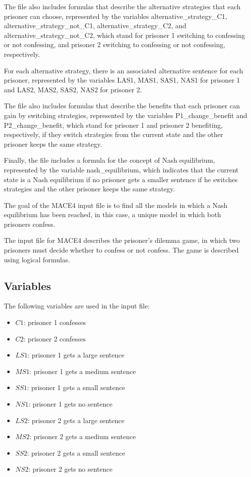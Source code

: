 \documentclass[a4paper,12pt]{report}
\begin{document}
The file also includes formulas that describe the alternative strategies that each prisoner can choose, represented by the variables alternative\_strategy\_C1, alternative\_strategy\_not\_C1, alternative\_strategy\_C2, and alternative\_strategy\_not\_C2, which stand for prisoner 1 switching to confessing or not confessing, and prisoner 2 switching to confessing or not confessing, respectively.

For each alternative strategy, there is an associated alternative sentence for each prisoner, represented by the variables LAS1, MAS1, SAS1, NAS1 for prisoner 1 and LAS2, MAS2, SAS2, NAS2 for prisoner 2.

The file also includes formulas that describe the benefits that each prisoner can gain by switching strategies, represented by the variables P1\_change\_benefit and P2\_change\_benefit, which stand for prisoner 1 and prisoner 2 benefiting, respectively, if they switch strategies from the current state and the other prisoner keeps the same strategy.

Finally, the file includes a formula for the concept of Nash equilibrium, represented by the variable nash\_equilibrium, which indicates that the current state is a Nash equilibrium if no prisoner gets a smaller sentence if he switches strategies and the other prisoner keeps the same strategy.

The goal of the MACE4 input file is to find all the models in which a Nash equilibrium has been reached, in this case, a unique model in which both prisoners confess.

The input file for MACE4 describes the prisoner's dilemma game, in which two prisoners must decide whether to confess or not confess. The game is described using logical formulas.

\subsection{Variables}

The following variables are used in the input file:

\begin{itemize}
\item $C1$: prisoner 1 confesses
\item $C2$: prisoner 2 confesses
\item $LS1$: prisoner 1 gets a large sentence
\item $MS1$: prisoner 1 gets a medium sentence
\item $SS1$: prisoner 1 gets a small sentence
\item $NS1$: prisoner 1 gets no sentence
\item $LS2$: prisoner 2 gets a large sentence
\item $MS2$: prisoner 2 gets a medium sentence
\item $SS2$: prisoner 2 gets a small sentence
\item $NS2$: prisoner 2 gets no sentence
\end{itemize}
\end{document}
